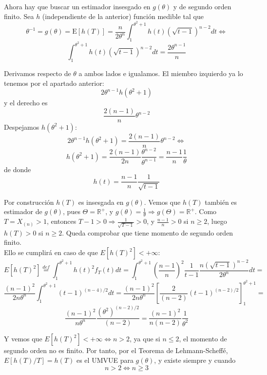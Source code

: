 \documentclass[12pt]{article}
\newcommand{\E}{\mathrm{E}}
\newcommand{\R}{\mathbb{R}}
\newcommand{\Rmas}{\R^{+}}
\begin{document}
\begin{ejercicio}
\begin{enumerate}[label=\alph*)]
            Ahora hay que buscar un estimador insesgado en $g(\theta)$ y de segundo orden finito. Sea $h$ (independiente de la anterior) función medible tal que
            $$\theta^{-1} = g(\theta) = \E[h(T)] = \dfrac{n}{2\theta^{n}} \int_{1}^{\theta^2+1} h(t) (\sqrt{t-1})^{n-2} dt \iff$$
            $$\int_{1}^{\theta^2+1} h(t) (\sqrt{t-1})^{n-2} dt = \dfrac{2 \theta^{n-1}}{n} $$

            Derivamos respecto de $\theta$ a ambos lados e igualamos. El miembro izquierdo ya lo tenemos por el apartado anterior:
            $$2 \theta^{n-1} h(\theta^2+1)$$
            y el derecho es 
            $$\dfrac{2(n-1)}{n} \theta^{n-2}$$
            Despejamos $h(\theta^2+1)$:
            $$2 \theta^{n-1} h(\theta^2+1) = \dfrac{2(n-1)}{n} \theta^{n-2} \iff $$
            $$h(\theta^2+1) = \dfrac{2(n-1)}{2n} \dfrac{\theta^{n-2}}{\theta^{n-1}} = \dfrac{n-1}{n} \dfrac{1}{\theta}$$
            de donde
            $$h(t) = \dfrac{n-1}{n} \dfrac{1}{\sqrt{t-1}}$$

            Por construcción $h(T)$ es insesgada en $g(\theta)$. Vemos que $h(T)$ también es estimador de $g(\theta)$, 
            pues $\Theta = \Rmas$, y $g(\theta) = \frac{1}{\theta} \Longrightarrow g(\Theta) = \Rmas$. 
            Como $T = X_{(n)} > 1$, entonces $T - 1 > 0 \Longrightarrow \frac{1}{\sqrt{T-1}} > 0$, y $\frac{n-1}{n} > 0$ si $n \geq 2$, luego $h(T) > 0$ si $n \geq 2$. Queda comprobar que tiene momento de segundo orden finito. \\

            Ello se cumplirá en caso de que $E[h(T)^2] < + \infty$:
            $$E[h(T)^2] \stackrel{def}{=} \int_{1}^{\theta^2+1} h(t)^2 f_T(t) dt = \int_{1}^{\theta^2+1} 
            \left( \dfrac{n-1}{n} \right)^2 \dfrac{1}{t-1} \dfrac{n(\sqrt{t-1})^{n-2}}{2\theta^{n}} dt = $$
            $$\dfrac{(n-1)^2}{2n\theta^{n}} \int_{1}^{\theta^2+1} (t-1)^{(n-4)/2}dt = 
            \dfrac{(n-1)^2}{2n\theta^{n}} \left[\dfrac{2}{(n-2)} (t-1)^{(n-2)/2} \right]_1^{\theta^2+1} = $$
            $$\dfrac{(n-1)^2}{n\theta^{n}} \dfrac{(\theta^2)^{(n-2)/2}}{(n-2)} = \dfrac{(n-1)^2}{n(n-2)} \dfrac{1}{\theta^2}$$

            Y vemos que $E[h(T)^2] < + \infty \iff n > 2$, ya que si $n \leq 2$, el momento de segundo orden no es finito.
            Por tanto, por el Teorema de Lehmann-Scheffé, $E[h(T)/T] = h(T)$ es el UMVUE para $g(\theta)$, y existe siempre y
            cuando $$n>2 \iff n \geq 3$$

            \newpage


\end{enumerate}
\end{ejercicio}
\end{document}

